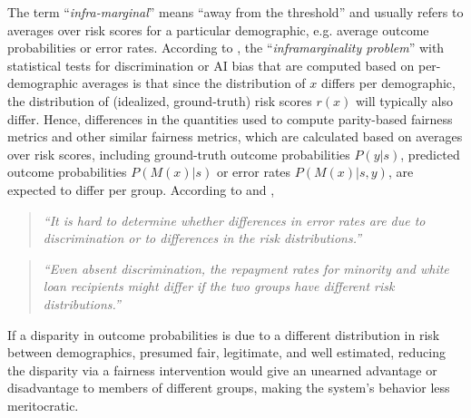 \documentclass[11pt,dvipdfm]{article}
\begin{document}
The term ``\emph{infra-marginal}'' means ``away from the threshold'' and usually refers to averages over risk scores for a particular demographic, e.g. average outcome probabilities or error rates.  According to \cite{corbettdavies2018measure,simoiu2017problem}, the ``\emph{inframarginality problem}'' with statistical tests for discrimination or AI bias that are computed based on per-demographic averages is that since the distribution of $x$ differs per demographic, the distribution of (idealized, ground-truth) risk scores $r(x)$ will typically also differ.  Hence, differences in the quantities used to compute parity-based fairness metrics and other similar fairness metrics,  which are calculated based on averages over risk scores, including ground-truth outcome probabilities $P(y|s)$, predicted outcome probabilities $P(M(x)|s)$ or error rates $P(M(x)|s,y)$, are expected to differ per group.  According to \cite{corbettdavies2018measure} and \cite{simoiu2017problem}, 
\begin{quote}
    \emph{``It is hard to determine whether differences in error rates are due to discrimination or to differences in the risk distributions.''} \cite{corbettdavies2018measure}
\end{quote}
\begin{quote}
\emph{``Even absent discrimination, the repayment rates for minority and white loan recipients might differ if the two groups have different risk distributions.''} \cite{simoiu2017problem}
\end{quote}
If a disparity in outcome probabilities is due to a different distribution in risk between demographics, presumed fair, legitimate, and well estimated, reducing the disparity via a fairness intervention would give an unearned advantage or disadvantage to members of different groups, making the system's behavior less meritocratic. 


\end{document}
